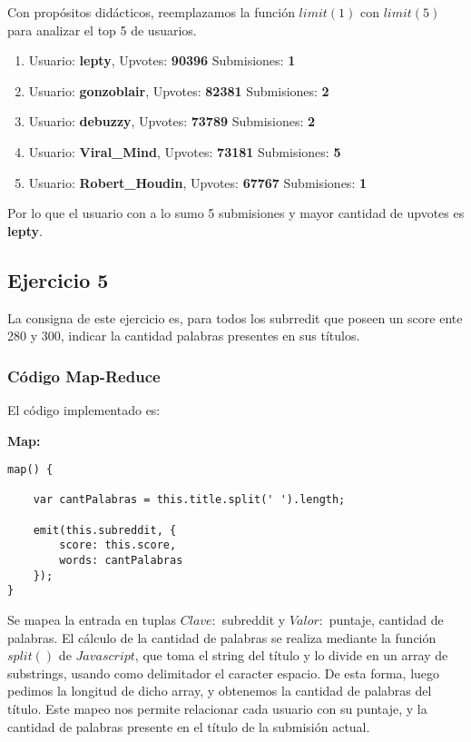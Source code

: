 Con prop\'ositos did\'acticos, reemplazamos la funci\'on $limit(1)$ con $limit(5)$ para analizar el top 5 de usuarios.

\begin{enumerate}

\item Usuario: \textbf{lepty}, Upvotes: \textbf{90396} Submisiones: \textbf{1}
\item Usuario: \textbf{gonzoblair}, Upvotes: \textbf{82381} Submisiones: \textbf{2}
\item Usuario: \textbf{debuzzy}, Upvotes: \textbf{73789} Submisiones: \textbf{2}
\item Usuario: \textbf{Viral\_Mind}, Upvotes: \textbf{73181} Submisiones: \textbf{5}
\item Usuario: \textbf{Robert\_Houdin}, Upvotes: \textbf{67767} Submisiones: \textbf{1}

\end{enumerate}

Por lo que el usuario con a lo sumo 5 submisiones y mayor cantidad de upvotes es \textbf{lepty}.

\subsection{Ejercicio 5}

La consigna de este ejercicio es, para todos los subrredit que poseen un score ente 280 y 300, indicar la cantidad palabras presentes en sus t\'itulos.

\subsubsection{C\'odigo Map-Reduce}

El c\'odigo implementado es:

\textbf{Map:}

\begin{lstlisting}
map() {

	var cantPalabras = this.title.split(' ').length;

    emit(this.subreddit, {
    	score: this.score,
    	words: cantPalabras
    });
}

\end{lstlisting}

Se mapea la entrada en tuplas $Clave:$ subreddit y $Valor:$ puntaje, cantidad de palabras. El c\'alculo de la cantidad de palabras se realiza mediante la funci\'on $split()$ de $Javascript$, que toma el string del t\'itulo y lo divide en un array de substrings, usando como delimitador el caracter espacio. De esta forma, luego pedimos la longitud de dicho array, y obtenemos la cantidad de palabras del t\'itulo. Este mapeo nos permite relacionar cada usuario con su puntaje, y la cantidad de palabras presente en el t\'itulo de la submisi\'on actual.

